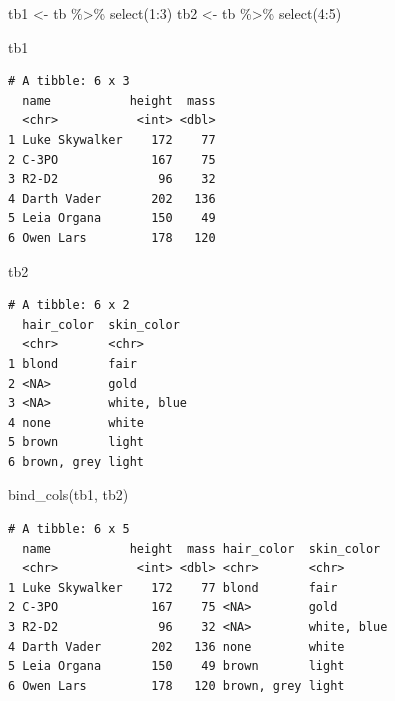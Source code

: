\documentclass[
  letterpaper,
]{ctexbook}
\newenvironment{Shaded}{\begin{snugshade}}{\end{snugshade}}
\newcommand{\DecValTok}[1]{\textcolor[rgb]{0.68,0.00,0.00}{#1}}
\newcommand{\FunctionTok}[1]{\textcolor[rgb]{0.28,0.35,0.67}{#1}}
\newcommand{\NormalTok}[1]{\textcolor[rgb]{0.00,0.23,0.31}{#1}}
\newcommand{\OtherTok}[1]{\textcolor[rgb]{0.00,0.23,0.31}{#1}}
\newcommand{\SpecialCharTok}[1]{\textcolor[rgb]{0.37,0.37,0.37}{#1}}
\begin{document}
\begin{Shaded}
\begin{Highlighting}[]
\NormalTok{tb1 }\OtherTok{\textless{}{-}}\NormalTok{ tb }\SpecialCharTok{\%\textgreater{}\%}
  \FunctionTok{select}\NormalTok{(}\DecValTok{1}\SpecialCharTok{:}\DecValTok{3}\NormalTok{)}
\NormalTok{tb2 }\OtherTok{\textless{}{-}}\NormalTok{ tb }\SpecialCharTok{\%\textgreater{}\%}
  \FunctionTok{select}\NormalTok{(}\DecValTok{4}\SpecialCharTok{:}\DecValTok{5}\NormalTok{)}
\end{Highlighting}
\end{Shaded}

\begin{Shaded}
\begin{Highlighting}[]
\NormalTok{tb1}
\end{Highlighting}
\end{Shaded}

\begin{verbatim}
# A tibble: 6 x 3
  name           height  mass
  <chr>           <int> <dbl>
1 Luke Skywalker    172    77
2 C-3PO             167    75
3 R2-D2              96    32
4 Darth Vader       202   136
5 Leia Organa       150    49
6 Owen Lars         178   120
\end{verbatim}

\begin{Shaded}
\begin{Highlighting}[]
\NormalTok{tb2}
\end{Highlighting}
\end{Shaded}

\begin{verbatim}
# A tibble: 6 x 2
  hair_color  skin_color 
  <chr>       <chr>      
1 blond       fair       
2 <NA>        gold       
3 <NA>        white, blue
4 none        white      
5 brown       light      
6 brown, grey light      
\end{verbatim}

\begin{Shaded}
\begin{Highlighting}[]
\FunctionTok{bind\_cols}\NormalTok{(tb1, tb2)}
\end{Highlighting}
\end{Shaded}

\begin{verbatim}
# A tibble: 6 x 5
  name           height  mass hair_color  skin_color 
  <chr>           <int> <dbl> <chr>       <chr>      
1 Luke Skywalker    172    77 blond       fair       
2 C-3PO             167    75 <NA>        gold       
3 R2-D2              96    32 <NA>        white, blue
4 Darth Vader       202   136 none        white      
5 Leia Organa       150    49 brown       light      
6 Owen Lars         178   120 brown, grey light      
\end{verbatim}
\end{document}
